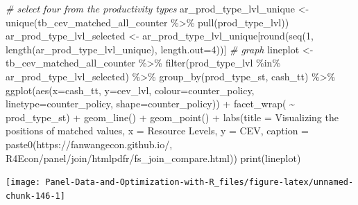 \documentclass[
]{book}
\newenvironment{Shaded}{\begin{snugshade}}{\end{snugshade}}
\newcommand{\AttributeTok}[1]{\textcolor[rgb]{0.77,0.63,0.00}{#1}}
\newcommand{\CommentTok}[1]{\textcolor[rgb]{0.56,0.35,0.01}{\textit{#1}}}
\newcommand{\DecValTok}[1]{\textcolor[rgb]{0.00,0.00,0.81}{#1}}
\newcommand{\FunctionTok}[1]{\textcolor[rgb]{0.00,0.00,0.00}{#1}}
\newcommand{\NormalTok}[1]{#1}
\newcommand{\OtherTok}[1]{\textcolor[rgb]{0.56,0.35,0.01}{#1}}
\newcommand{\SpecialCharTok}[1]{\textcolor[rgb]{0.00,0.00,0.00}{#1}}
\newcommand{\StringTok}[1]{\textcolor[rgb]{0.31,0.60,0.02}{#1}}
\begin{document}
\begin{Shaded}
\begin{Highlighting}[]
\CommentTok{\# select four from the productivity types}
\NormalTok{ar\_prod\_type\_lvl\_unique }\OtherTok{\textless{}{-}} \FunctionTok{unique}\NormalTok{(tb\_cev\_matched\_all\_counter }\SpecialCharTok{\%\textgreater{}\%} \FunctionTok{pull}\NormalTok{(prod\_type\_lvl))}
\NormalTok{ar\_prod\_type\_lvl\_selected }\OtherTok{\textless{}{-}}\NormalTok{ ar\_prod\_type\_lvl\_unique[}\FunctionTok{round}\NormalTok{(}\FunctionTok{seq}\NormalTok{(}\DecValTok{1}\NormalTok{, }\FunctionTok{length}\NormalTok{(ar\_prod\_type\_lvl\_unique), }\AttributeTok{length.out=}\DecValTok{4}\NormalTok{))]}
\CommentTok{\# graph}
\NormalTok{lineplot }\OtherTok{\textless{}{-}}\NormalTok{ tb\_cev\_matched\_all\_counter }\SpecialCharTok{\%\textgreater{}\%}
    \FunctionTok{filter}\NormalTok{(prod\_type\_lvl }\SpecialCharTok{\%in\%}\NormalTok{ ar\_prod\_type\_lvl\_selected) }\SpecialCharTok{\%\textgreater{}\%}
    \FunctionTok{group\_by}\NormalTok{(prod\_type\_st, cash\_tt) }\SpecialCharTok{\%\textgreater{}\%}
    \FunctionTok{ggplot}\NormalTok{(}\FunctionTok{aes}\NormalTok{(}\AttributeTok{x=}\NormalTok{cash\_tt, }\AttributeTok{y=}\NormalTok{cev\_lvl,}
               \AttributeTok{colour=}\NormalTok{counter\_policy, }\AttributeTok{linetype=}\NormalTok{counter\_policy, }\AttributeTok{shape=}\NormalTok{counter\_policy)) }\SpecialCharTok{+}
        \FunctionTok{facet\_wrap}\NormalTok{( }\SpecialCharTok{\textasciitilde{}}\NormalTok{ prod\_type\_st) }\SpecialCharTok{+}
        \FunctionTok{geom\_line}\NormalTok{() }\SpecialCharTok{+}
        \FunctionTok{geom\_point}\NormalTok{() }\SpecialCharTok{+}
        \FunctionTok{labs}\NormalTok{(}\AttributeTok{title =} \StringTok{\textquotesingle{}Visualizing the positions of matched values\textquotesingle{}}\NormalTok{,}
             \AttributeTok{x =} \StringTok{\textquotesingle{}Resource Levels\textquotesingle{}}\NormalTok{,}
             \AttributeTok{y =} \StringTok{\textquotesingle{}CEV\textquotesingle{}}\NormalTok{,}
             \AttributeTok{caption =} \FunctionTok{paste0}\NormalTok{(}\StringTok{\textquotesingle{}https://fanwangecon.github.io/\textquotesingle{}}\NormalTok{,}
                              \StringTok{\textquotesingle{}R4Econ/panel/join/htmlpdfr/fs\_join\_compare.html\textquotesingle{}}\NormalTok{)) }
\FunctionTok{print}\NormalTok{(lineplot)}
\end{Highlighting}
\end{Shaded}

\begin{center}\texttt{[image: Panel-Data-and-Optimization-with-R\_files/figure-latex/unnamed-chunk-146-1]} \end{center}
\end{document}

